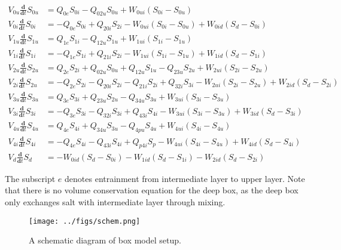 \documentclass{article}
\begin{document}
\begin{equation}
\begin{aligned}
V_{0u}\frac{\mathbf{d}}{\mathbf{d}t}S_{0u} &= Q_{0e}S_{0i} - Q_{02u}S_{0u} + W_{0ui}(S_{0i}-S_{0u}) \\
V_{0i}\frac{\mathbf{d}}{\mathbf{d}t}S_{0i} &= -Q_{0e}S_{0i} + Q_{20i}S_{2i} - W_{0ui}(S_{0i}-S_{0u}) + W_{0id}(S_{d}-S_{0i}) \\
V_{1u}\frac{\mathbf{d}}{\mathbf{d}t}S_{1u} &= Q_{1e}S_{1i} - Q_{12u}S_{1u} + W_{1ui}(S_{1i}-S_{1u}) \\
V_{1i}\frac{\mathbf{d}}{\mathbf{d}t}S_{1i} &= -Q_{1e}S_{1i} + Q_{21i}S_{2i} - W_{1ui}(S_{1i}-S_{1u}) + W_{1id}(S_{d}-S_{1i}) \\
V_{2u}\frac{\mathbf{d}}{\mathbf{d}t}S_{2u} &= Q_{2e}S_{2i} + Q_{02u}S_{0u} + Q_{12u}S_{1u} -  Q_{23u}S_{2u} + W_{2ui}(S_{2i}-S_{2u}) \\
V_{2i}\frac{\mathbf{d}}{\mathbf{d}t}S_{2u} &= -Q_{2e}S_{2i} - Q_{20i}S_{2i} - Q_{21i}S_{2i} + Q_{32i}S_{3i} - W_{2ui}(S_{2i}-S_{2u}) + W_{2id}(S_{d}-S_{2i}) \\
V_{3u}\frac{\mathbf{d}}{\mathbf{d}t}S_{3u} &= Q_{3e}S_{3i} + Q_{23u}S_{2u} - Q_{34u}S_{3u} + W_{3ui}(S_{3i}-S_{3u}) \\
V_{3i}\frac{\mathbf{d}}{\mathbf{d}t}S_{3i} &= -Q_{3e}S_{3i} - Q_{32i}S_{3i} + Q_{43i}S_{4i} - W_{3ui}(S_{3i}-S_{3u}) + W_{3id}(S_{d}-S_{3i}) \\
V_{4u}\frac{\mathbf{d}}{\mathbf{d}t}S_{4u} &= Q_{4e}S_{4i} + Q_{34u}S_{3u} - Q_{4pu}S_{4u} + W_{4ui}(S_{4i}-S_{4u}) \\
V_{4i}\frac{\mathbf{d}}{\mathbf{d}t}S_{4i} &= -Q_{4e}S_{4i} - Q_{43i}S_{4i} + Q_{p4i}S_{p} - W_{4ui}(S_{4i}-S_{4u}) + W_{4id}(S_{d}-S_{4i}) \\
V_{d}\frac{\mathbf{d}}{\mathbf{d}t}S_{d} &= -W_{0id}(S_{d}-S_{0i}) - W_{1id}(S_{d}-S_{1i}) - W_{2id}(S_{d}-S_{2i})
\end{aligned}
\label{eq:sbudget2}
\end{equation}

The subscript $e$ denotes entrainment from intermediate layer to upper layer. Note that there is no volume conservation equation for the deep box, as the deep box only exchanges salt with intermediate layer through mixing. \\

\begin{figure}
\centerline{\texttt{[image: ../figs/schem.png]}}
\caption{A schematic diagram of box model setup.}
\label{fig:box}
\end{figure}
\end{document}
